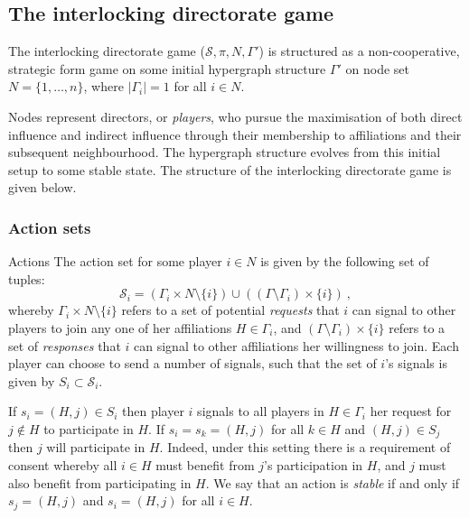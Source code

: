 \begin{subappendices}
\subsection{The interlocking directorate game}

The interlocking directorate game ($\mathcal{S}, \pi, N, \Gamma'$) is structured as a non-cooperative, strategic form game on some initial hypergraph structure $\Gamma'$ on node set $N = \{1,\ldots,n\}$, where $| \Gamma_{i} | = 1$ for all $i \in N$.

Nodes represent directors, or \emph{players}, who pursue the maximisation of both direct influence and indirect influence through their membership to affiliations and their subsequent neighbourhood. The hypergraph structure evolves from this initial setup to some stable state. The structure of the interlocking directorate game is given below.

\subsubsection*{Action sets}

Actions The action set for some player $i \in N$ is given by the following set of tuples:
\begin{equation}
\mathcal{S}_{i} = \left( \Gamma_{i} \times N \setminus \{i\} \right) \cup \left( \left( \Gamma \setminus \Gamma_{i} \right) \times \{i\} \right) ~ ,
\end{equation}
whereby $\Gamma_{i} \times N \setminus \{i\}$ refers to a set of potential \emph{requests} that $i$ can signal to other players to join any one of her affiliations $H \in \Gamma_{i}$, and $\left( \Gamma \setminus \Gamma_{i} \right) \times \{i\}$ refers to a set of \emph{responses} that $i$ can signal to other affiliations her willingness to join. Each player can choose to send a number of signals, such that the set of $i$'s signals is given by $S_{i} \subset \mathcal{S}_{i}$.

If $s_{i} = (H,j) \in S_{i}$ then player $i$ signals to all players in $H \in \Gamma_{i}$ her request for $j \notin H$ to participate in $H$. If $s_{i} = s_{k} = (H,j)$ for all $k \in H$ and $(H,j) \in S_{j}$ then $j$ will participate in $H$. Indeed, under this setting there is a requirement of consent whereby all $i \in H$ must benefit from $j$'s participation in $H$, and $j$ must also benefit from participating in $H$. We say that an action is \emph{stable} if and only if $s_{j} = (H,j)$ and $s_{i} = (H,j)$ for all $i \in H$.


\end{subappendices}
